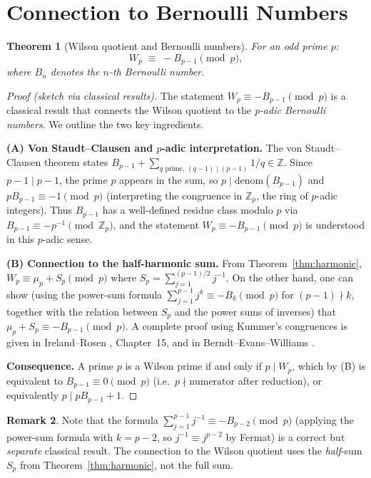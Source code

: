 \documentclass[12pt,a4paper]{amsart}
\newtheorem{theorem}{Theorem}[section]
\theoremstyle{definition}
\newtheorem{remark}[theorem]{Remark}
\newcommand{\Z}{\mathbb{Z}}
\begin{document}
\section{Connection to Bernoulli Numbers}

\begin{theorem}[Wilson quotient and Bernoulli numbers]\label{thm:bernoulli}
  For an odd prime $p$:
  \[
    W_p \;\equiv\; -B_{p-1} \pmod p,
  \]
  where $B_n$ denotes the $n$-th Bernoulli number.
\end{theorem}

\begin{proof}[Proof (sketch via classical results)]
  The statement $W_p \equiv -B_{p-1} \pmod p$ is a classical result
  that connects the Wilson quotient to the \emph{p-adic Bernoulli numbers}.
  We outline the two key ingredients.

  \textbf{(A) Von Staudt--Clausen and $p$-adic interpretation.}
  The von Staudt--Clausen theorem states
  $B_{p-1} + \sum_{q \text{ prime},\,(q-1)\mid(p-1)} 1/q \in \Z$.
  Since $p-1 \mid p-1$, the prime $p$ appears in the sum, so
  $p \mid \text{denom}(B_{p-1})$ and $pB_{p-1} \equiv -1 \pmod p$
  (interpreting the congruence in $\Z_p$, the ring of $p$-adic integers).
  Thus $B_{p-1}$ has a well-defined residue class modulo $p$ via
  $B_{p-1} \equiv -p^{-1} \pmod{\Z_p}$, and the statement $W_p \equiv -B_{p-1}
  \pmod p$ is understood in this $p$-adic sense.

  \textbf{(B) Connection to the half-harmonic sum.}
  From Theorem~\ref{thm:harmonic}, $W_p \equiv \mu_p + S_p \pmod p$ where
  $S_p = \sum_{j=1}^{(p-1)/2} j^{-1}$.  On the other hand, one can show
  (using the power-sum formula $\sum_{j=1}^{p-1} j^k \equiv -B_k \pmod p$
  for $(p-1) \nmid k$, together with the relation between $S_p$ and the
  power sums of inverses) that $\mu_p + S_p \equiv -B_{p-1} \pmod p$.
  A complete proof using Kummer's congruences is given in
  Ireland--Rosen \cite{Ireland1990}, Chapter~15, and in
  Berndt--Evans--Williams \cite{BEW1998}.

  \textbf{Consequence.}  A prime $p$ is a Wilson prime if and only if
  $p \mid W_p$, which by (B) is equivalent to $B_{p-1} \equiv 0 \pmod p$
  (i.e.\ $p \nmid \text{numerator}$ after reduction), or equivalently
  $p \mid pB_{p-1} + 1$.
\end{proof}

\begin{remark}
  Note that the formula $\sum_{j=1}^{p-1} j^{-1} \equiv -B_{p-2} \pmod p$
  (applying the power-sum formula with $k = p-2$, so $j^{-1} \equiv j^{p-2}$
  by Fermat) is a correct but \emph{separate} classical result.
  The connection to the Wilson quotient uses the \emph{half}-sum $S_p$
  from Theorem~\ref{thm:harmonic}, not the full sum.
\end{remark}
\end{document}
